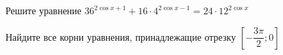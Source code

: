 \begin{ex}
	\begin{condition}
		\begin{enumcols}[label=\asbuk*)]
			\item Решите уравнение \( 36^{2\cos x + 1 } + 16\cdot4^{2\cos x - 1} = 24\cdot 12^{2\cos x} \)
			\item Найдите все корни уравнения, принадлежащие отрезку \( \left[-\dfrac{3\pi}{2};0\right] \)
		\end{enumcols}
	\end{condition}
\end{ex}